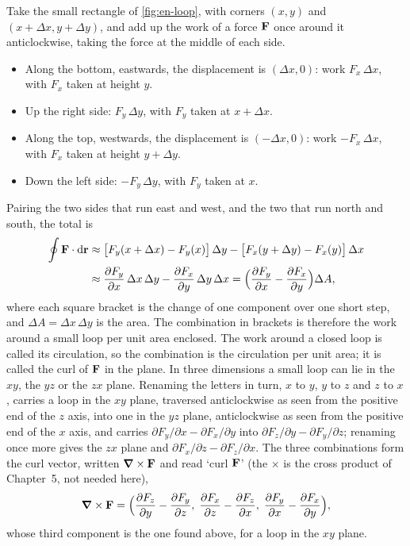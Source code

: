 \begin{toolbox}
Take the small rectangle of \cref{fig:en-loop}, with corners $(x, y)$ and
$(x + \Delta x, y + \Delta y)$, and add up the work of a force $\bm{\mathrm{F}}$
once around it anticlockwise, taking the force at the middle of each
side.
\begin{itemize}
\item Along the bottom, eastwards, the displacement is $(\Delta x, 0)$:
   work $F_x\,\Delta x$, with $F_x$ taken at height $y$.
\item Up the right side: $F_y\,\Delta y$, with $F_y$ taken at $x +
   \Delta x$.
\item Along the top, westwards, the displacement is $(-\Delta x, 0)$:
   work $-F_x\,\Delta x$, with $F_x$ taken at height $y + \Delta y$.
\item Down the left side: $-F_y\,\Delta y$, with $F_y$ taken at $x$.
\end{itemize}
Pairing the two sides that run east and west, and the two that run north
and south, the total is
\begin{align*}
   \oint\bm{\mathrm{F}}\cdot\mathrm{d}\bm{\mathrm{r}}
   &\approx \bigl[F_y(x + \Delta x) - F_y(x)\bigr]\,\Delta y
   - \bigl[F_x(y + \Delta y) - F_x(y)\bigr]\,\Delta x\\
   &\approx \frac{\partial F_y}{\partial x}\,\Delta x\,\Delta y
   - \frac{\partial F_x}{\partial y}\,\Delta y\,\Delta x
   = \Bigl(\frac{\partial F_y}{\partial x}
   - \frac{\partial F_x}{\partial y}\Bigr)\Delta A ,
\end{align*}
where each square bracket is the change of one component over one short
step, and $\Delta A = \Delta x\,\Delta y$ is the area. The combination in
brackets is therefore the work around a small loop per unit area
enclosed. The work around a closed loop is called its circulation, so the
combination is the circulation per unit area; it is called the curl of
$\bm{\mathrm{F}}$ in the plane. In three dimensions a small loop can lie in the
$xy$, the $yz$ or the $zx$ plane. Renaming the letters in turn, $x$ to
$y$, $y$ to $z$ and $z$ to $x$, carries a loop in the $xy$ plane,
traversed anticlockwise as seen from the positive end of the $z$ axis,
into one in the $yz$ plane, anticlockwise as seen from the positive end of
the $x$ axis, and carries $\partial F_y/\partial x - \partial F_x/\partial
y$ into $\partial F_z/\partial y - \partial F_y/\partial z$; renaming once
more gives the $zx$ plane and $\partial F_x/\partial z - \partial
F_z/\partial x$. The three combinations form the curl vector, written
$\bm{\nabla}\times\bm{\mathrm{F}}$ and read `curl $\bm{\mathrm{F}}$' (the $\times$ is the cross
product of Chapter~5, not needed here),
\begin{equation*}
   \bm{\nabla}\times\bm{\mathrm{F}} = \Bigl(
   \frac{\partial F_z}{\partial y} - \frac{\partial F_y}{\partial z},\;
   \frac{\partial F_x}{\partial z} - \frac{\partial F_z}{\partial x},\;
   \frac{\partial F_y}{\partial x} - \frac{\partial F_x}{\partial y}
   \Bigr) ,
\end{equation*}
whose third component is the one found above, for a loop in the $xy$
plane.


\end{toolbox}

